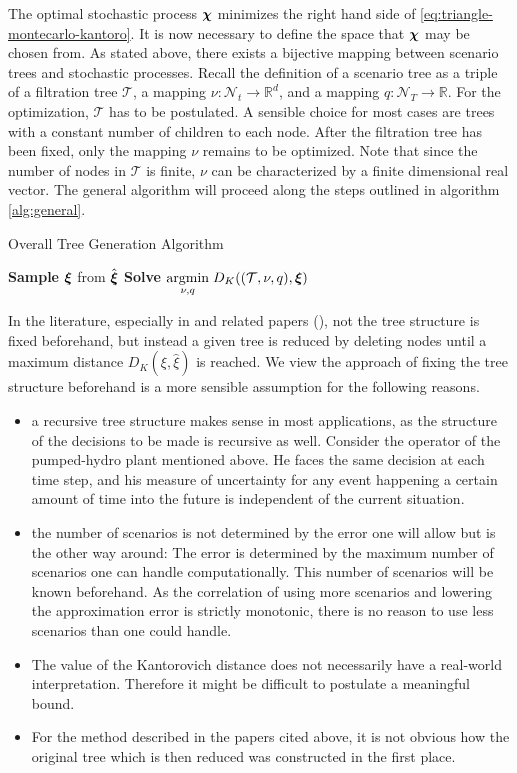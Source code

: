 The optimal stochastic process $\boldsymbol\chi$ minimizes the right hand side of \eqref{eq:triangle-montecarlo-kantoro}.
It is now necessary to define the space that $\boldsymbol\chi$ may be chosen from.
As stated above, there exists a bijective mapping between scenario trees and stochastic processes.
Recall the definition of a scenario tree as a triple of a filtration tree $\mathcal{T}$, a mapping $\nu:\mathcal{N}_t\rightarrow\mathbb{R}^d$, and a mapping $q:\mathcal{N}_T\rightarrow\mathbb{R}$.
For the optimization, $\mathcal{T}$ has to be postulated.
A sensible choice for most cases are trees with a constant number of children to each node.
After the filtration tree has been fixed, only the mapping $\nu$ remains to be optimized.
Note that since the number of nodes in $\mathcal{T}$ is finite, $\nu$ can be characterized by a finite dimensional real vector.
The general algorithm will proceed along the steps outlined in algorithm \ref{alg:general}.
\begin{algorithm}
  \label{alg:general}
  \caption{Overall Tree Generation Algorithm}
  \BlankLine
  \textbf{Sample} $\boldsymbol\xi$ from $\hat{\boldsymbol\xi}$\;
  \textbf{Solve} $\underset{\nu,q}{\operatorname{argmin}}\; D_K((\mathcal{T},\nu, q), \boldsymbol\xi)$\;
\end{algorithm}

In the literature, especially in \cite{Heitsch2009} and related papers (\cite{Dupacova2003,Heitsch2003,Heitsch2009a,Heitsch2010}), not the tree structure is fixed beforehand, but instead a given tree is reduced by deleting nodes until a maximum distance $D_K(\xi,\hat{\xi})$ is reached.
We view the approach of fixing the tree structure beforehand is a more sensible assumption for the following reasons.
\begin{itemize}
\item a recursive tree structure makes sense in most applications, as the structure of the decisions to be made is recursive as well.
Consider the operator of the pumped-hydro plant mentioned above.
He faces the same decision at each time step, and his measure of uncertainty for any event happening a certain amount of time into the future is independent of the current situation.
\item the number of scenarios is not determined by the error one will allow but is the other way around: The error is determined by the maximum number of scenarios one can handle computationally.
This number of scenarios will be known beforehand.
As the correlation of using more scenarios and lowering the approximation error is strictly monotonic, there is no reason to use less scenarios than one could handle.
\item The value of the Kantorovich distance does not necessarily have a real-world interpretation.
Therefore it might be difficult to postulate a meaningful bound.
\item For the method described in the papers cited above, it is not obvious how the original tree which is then reduced was constructed in the first place.
\end{itemize}

